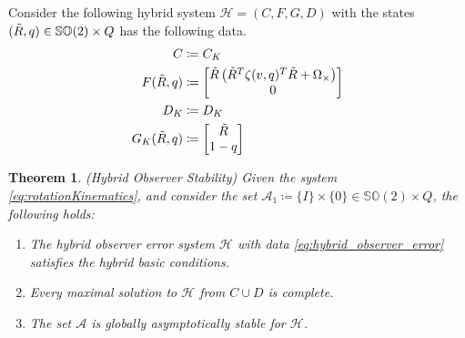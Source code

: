 \documentclass{article}
\newcommand{\SOtwo}{\mathbb{SO}(2)}
\newtheorem{theorem}{Theorem}
\newcommand{\brackets}[1]{\left(#1\right)}
\begin{document}
Consider the following hybrid system $\mathcal{H} = (C, F, G, D)$ with the states $(\Tilde{R}, q) \in \SOtwo\times Q$ has the following data. 
\begin{subequations}\label{eq:hybrid_observer_error}
\begin{align}
C&\coloneqq C_K\\
F(\Tilde{R}, q)&\coloneqq \begin{bmatrix}
    \Tilde{R}\brackets{\Tilde{R}^T\zeta(v, q)^T\Tilde{R} + \Omega_\times}\\ 0\end{bmatrix}\\
D_K &\coloneqq D_K\\
G_K(\Tilde{R}, q) &\coloneqq \begin{bmatrix}
\Tilde{R} \\ 1 - q
\end{bmatrix}
\end{align}
\end{subequations}

\begin{theorem}(Hybrid Observer Stability)
    Given the system \eqref{eq:rotationKinematics}, and consider the set $\mathcal{A}_1\coloneqq \{I\}\times \{0\} \in \SOtwo\times Q$, the following holds:
    \begingroup
    \renewcommand\labelenumi{(\theenumi)}
    \begin{enumerate}
        \item \label{(1)}The hybrid observer error system $\mathcal{H}$ with data \eqref{eq:hybrid_observer_error} satisfies the hybrid basic conditions.
        \item \label{(2)}Every maximal solution to $\mathcal{H}$ from $C\cup D$ is complete. 
        \item \label{(3)}The set $\mathcal{A}$ is globally asymptotically stable for $\mathcal{H}$. 
    \end{enumerate}
    \endgroup
    \end{theorem}
\end{document}
